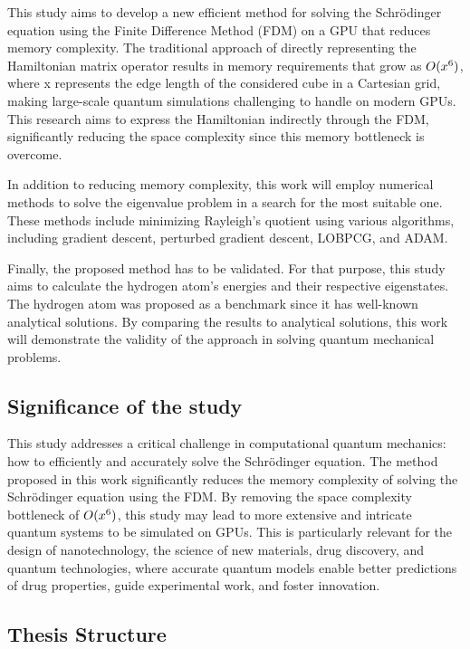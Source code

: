 This study aims to develop a new efficient method for solving the Schrödinger equation using the Finite Difference Method (FDM) on a GPU that reduces memory complexity. The traditional approach of directly representing the Hamiltonian matrix operator results in memory requirements that grow as $O(x\textsuperscript{6})$, where x represents the edge length of the considered cube in a Cartesian grid, making large-scale quantum simulations challenging to handle on modern GPUs. This research aims to express the Hamiltonian indirectly through the FDM, significantly reducing the space complexity since this memory bottleneck is overcome.

In addition to reducing memory complexity, this work will employ numerical methods to solve the eigenvalue problem in a search for the most suitable one. These methods include minimizing Rayleigh's quotient using various algorithms, including gradient descent, perturbed gradient descent, LOBPCG, and ADAM.

Finally, the proposed method has to be validated. For that purpose, this study aims to calculate the hydrogen atom's energies and their respective eigenstates. The hydrogen atom was proposed as a benchmark since it has well-known analytical solutions. By comparing the results to analytical solutions, this work will demonstrate the validity of the approach in solving quantum mechanical problems.

\subsection{Significance of the study}

This study addresses a critical challenge in computational quantum mechanics: how to efficiently and accurately solve the Schrödinger equation. The method proposed in this work significantly reduces the memory complexity of solving the Schrödinger equation using the FDM. By removing the space complexity bottleneck of $O(x\textsuperscript{6})$, this study may lead to more extensive and intricate quantum systems to be simulated on GPUs. This is particularly relevant for the design of nanotechnology, the science of new materials, drug discovery, and quantum technologies, where accurate quantum models enable better predictions of drug properties, guide experimental work, and foster innovation.

\subsection{Thesis Structure}

